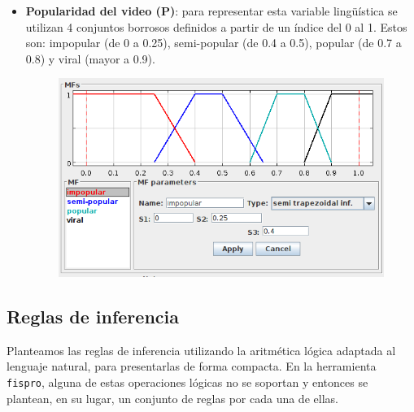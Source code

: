 \documentclass{article}
\begin{document}
\begin{itemize}
\begin{figure}[H]
	\end{figure}
	\item \textbf{Popularidad del video (P)}: para representar esta variable lingüística se utilizan 4 conjuntos borrosos definidos a partir de un índice del 0 al 1. Estos son: impopular (de 0 a 0.25), semi-popular (de 0.4 a 0.5), popular (de 0.7 a 0.8) y viral (mayor a 0.9).
	\begin{figure}[H]
		\centering
		\includegraphics[scale=0.55]{./Images/popularidad.png}
	\end{figure}
\end{itemize}

\subsection{Reglas de inferencia}

Planteamos las reglas de inferencia utilizando la aritmética lógica adaptada al lenguaje natural, para presentarlas de forma compacta. En la herramienta \\ \verb|fispro|, alguna de estas operaciones lógicas no se soportan y entonces se plantean, en su lugar, un conjunto de reglas por cada una de ellas.
\end{document}
